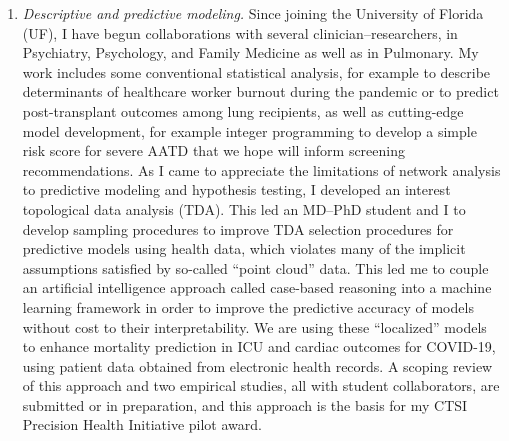 \documentclass{nihbiosketch}
\begin{document}
\begin{enumerate}
\item \emph{Descriptive and predictive modeling.}
Since joining the University of Florida (UF), I have begun collaborations with several clinician--researchers, in Psychiatry, Psychology, and Family Medicine as well as in Pulmonary.
My work includes some conventional statistical analysis, for example to describe determinants of healthcare worker burnout during the pandemic or to predict post-transplant outcomes among lung recipients, as well as cutting-edge model development, for example integer programming to develop a simple risk score for severe AATD that we hope will inform screening recommendations.
As I came to appreciate the limitations of network analysis to predictive modeling and hypothesis testing, I developed an interest topological data analysis (TDA). This led an MD--PhD student and I to develop sampling procedures to improve TDA selection procedures for predictive models using health data, which violates many of the implicit assumptions satisfied by so-called ``point cloud'' data.
This led me to couple an artificial intelligence approach called case-based reasoning into a machine learning framework in order to improve the predictive accuracy of models without cost to their interpretability. We are using these ``localized'' models to enhance mortality prediction in ICU and cardiac outcomes for COVID-19, using patient data obtained from electronic health records. A scoping review of this approach and two empirical studies, all with student collaborators, are submitted or in preparation, and this approach is the basis for my CTSI Precision Health Initiative pilot award.


\end{enumerate}
\end{document}
